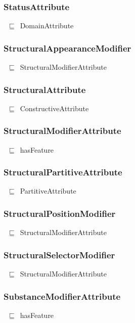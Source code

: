 \documentclass{article}
\begin{document}
\subsubsection*{StatusAttribute}

~\ensuremath{\sqsubseteq}~DomainAttribute

\subsubsection*{StructuralAppearanceModifier}

~\ensuremath{\sqsubseteq}~StructuralModifierAttribute

\subsubsection*{StructuralAttribute}

~\ensuremath{\sqsubseteq}~ConstructiveAttribute

\subsubsection*{StructuralModifierAttribute}

~\ensuremath{\sqsubseteq}~hasFeature

\subsubsection*{StructuralPartitiveAttribute}

~\ensuremath{\sqsubseteq}~PartitiveAttribute

\subsubsection*{StructuralPositionModifier}

~\ensuremath{\sqsubseteq}~StructuralModifierAttribute

\subsubsection*{StructuralSelectorModifier}

~\ensuremath{\sqsubseteq}~StructuralModifierAttribute

\subsubsection*{SubstanceModifierAttribute}

~\ensuremath{\sqsubseteq}~hasFeature
\end{document}
